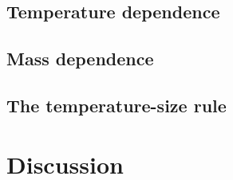 \documentclass[letter,12pt]{article}
\begin{document}
\subsection{Temperature dependence}



\subsection{Mass dependence}

\subsection{The temperature-size rule}

\section{Discussion}


\end{document}
